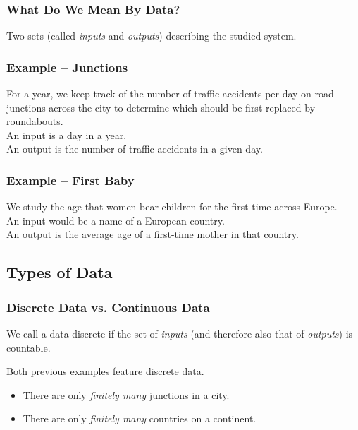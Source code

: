 \documentclass[aspectratio=169,11pt,svgnames]{beamer}
\begin{document}
\begin{frame}
 \frametitle{What Do We Mean By Data?}
 \begin{tcolorbox}[title=Data]
  \alert{Two sets} (called \emph{inputs} and \emph{outputs}) describing the
  studied system.
 \end{tcolorbox}
\end{frame}

\begin{frame}
 \frametitle{Example -- Junctions}
 For a year, we keep track of the number of traffic accidents per day on road
 junctions across the city to determine which should be first replaced by
 roundabouts.\\
 \pause
 An \alert{input} is a day in a year.\\
 \pause
 An \alert{output} is the number of traffic accidents in a given day.
\end{frame}

\begin{frame}
 \frametitle{Example -- First Baby}
 We study the age that women bear children for the first time across Europe.\\
 \pause
 An \alert{input} would be a name of a European country.\\
 An \alert{output} is the average age of a first-time mother in that country.
\end{frame}

\subsection{Types of Data}

\begin{frame}
 \subsectionpage
\end{frame}

\begin{frame}
 \frametitle{Discrete Data vs. Continuous Data}
 \begin{tcolorbox}[title=Discrete Data]
  We call a data \alert{discrete} if the set of \emph{inputs} (and therefore also
  that of \emph{outputs}) is \alert{countable}.
 \end{tcolorbox}
 \pause
 Both previous examples feature \alert{discrete} data.
 \begin{itemize}[label=\textbullet]
  \item There are only \emph{finitely many} junctions in a city.
  \pause
  \item There are only \emph{finitely many} countries on a continent.
 \end{itemize}
\end{frame}
\end{document}

